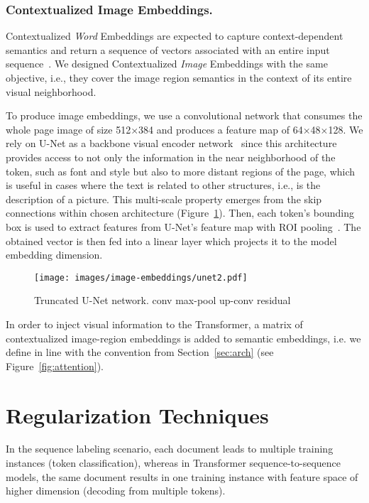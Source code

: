 \documentclass[runningheads]{llncs}
\begin{document}
\subsubsection{Contextualized Image Embeddings.}\label{sec:image_context}
Contextualized \emph{Word} Embeddings are expected to capture context-dependent semantics and return a sequence of vectors associated with an entire input sequence~\cite{Ethayarajh2019HowCA}. We designed Contextualized \emph{Image} Embeddings with the same objective, i.e., they cover the image region semantics in the context of its entire visual neighborhood.

To produce image embeddings, we use a convolutional network that consumes the whole page image of size 512×384 and produces a feature map of 64×48×128. We rely on U-Net as a backbone visual encoder network~\cite{RFB15a} since this architecture provides access to not only the information in the near neighborhood of the token, such as font and style but also to more distant regions of the page, which is useful in cases where the text is related to other structures, i.e., is the description of a picture. This multi-scale property emerges from the skip connections within chosen architecture (Figure~\ref{fig:unet}). Then, each token's bounding box is used to extract features from U-Net's feature map with ROI pooling~\cite{dai2016object}. The obtained vector is then fed into a linear layer which projects it to the model embedding dimension.

\begin{figure}
    \centering
    \texttt{[image: images/image-embeddings/unet2.pdf]}
    \caption{Truncated U-Net network.\quad {\color{applica}{\textbf{}}} conv \quad {\color{aorange}{\textbf{}}} max-pool \quad {\color{agreen}{\textbf{}}} up-conv \quad {\color{agray}{\textbf{}}} residual}
    \label{fig:unet}
\end{figure}

In order to inject visual information to the Transformer, a matrix of contextualized image-region embeddings  is added to semantic embeddings, i.e. we define  in line with the convention from Section~\ref{sec:arch} (see Figure~\ref{fig:attention}).



\section{Regularization Techniques}

In the sequence labeling scenario, each document leads to multiple training instances (token classification), whereas in Transformer sequence-to-sequence models, the same document results in one training instance with feature space of higher dimension (decoding from multiple tokens).
\end{document}
